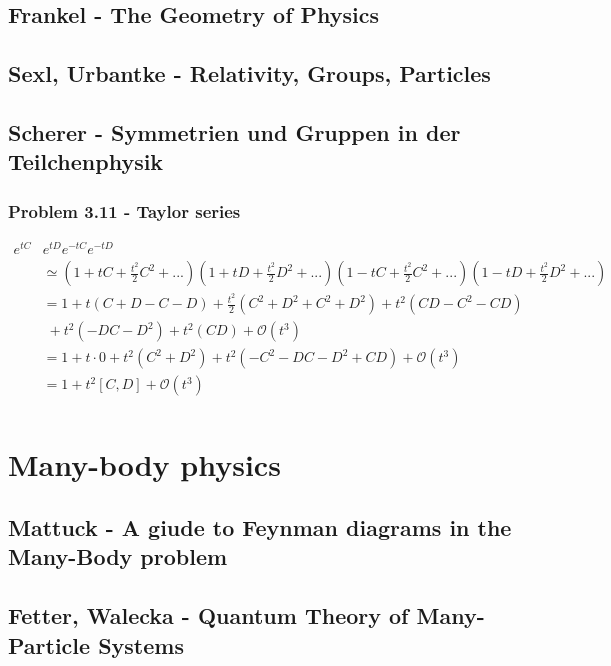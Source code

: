 \documentclass[10pt,a4paper]{book}
\theoremstyle{definition}
\begin{document}
\section{{\sc Frankel} - The Geometry of Physics}

\section{{\sc Sexl, Urbantke} - Relativity, Groups, Particles}

\section{{\sc Scherer} - Symmetrien und Gruppen in der Teilchenphysik}
\subsection{Problem 3.11 - Taylor series}
\begin{align}
e^{tC}&e^{tD}e^{-tC}e^{-tD}\\
&\simeq\left(1+tC+\frac{t^2}{2}C^2+...\right)\left(1+tD+\frac{t^2}{2}D^2+...\right)\left(1-tC+\frac{t^2}{2}C^2+...\right)\left(1-tD+\frac{t^2}{2}D^2+...\right)\\
&=1+t(C+D-C-D)+\frac{t^2}{2}(C^2+D^2+C^2+D^2)+t^2(CD-C^2-CD)\\
&\;+t^2(-DC-D^2)+t^2(CD)+\mathcal{O}(t^3)\\
&=1+t\cdot 0+t^2(C^2+D^2)+t^2(-C^2-DC-D^2+CD)+\mathcal{O}(t^3)\\
&=1+t^2[C,D]+\mathcal{O}(t^3)\\
\end{align}

\chapter{Many-body physics}

\section{{\sc Mattuck} - A giude to Feynman diagrams in the Many-Body problem}

\section{{\sc Fetter, Walecka} - Quantum Theory of Many-Particle Systems}
\end{document}
